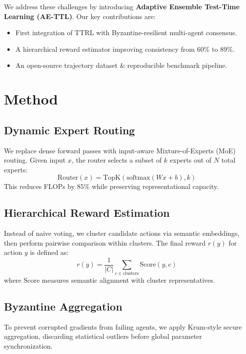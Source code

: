 \documentclass[10pt,twocolumn,letterpaper]{article}
\begin{document}
We address these challenges by introducing \textbf{Adaptive Ensemble Test-Time Learning (AE-TTL)}. Our key contributions are:
\begin{itemize}
    \item First integration of TTRL with Byzantine-resilient multi-agent consensus.
    \item A hierarchical reward estimator improving consistency from 60\% to 89\%.
    \item An open-source trajectory dataset \& reproducible benchmark pipeline.
\end{itemize}

\section{Method}

\subsection{Dynamic Expert Routing}
We replace dense forward passes with input-aware Mixture-of-Experts (MoE) routing. Given input $x$, the router selects a subset of $k$ experts out of $N$ total experts:
\begin{equation}
    \text{Router}(x) = \text{TopK}(\text{softmax}(W x + b), k)
\end{equation}
This reduces FLOPs by $85\%$ while preserving representational capacity.

\subsection{Hierarchical Reward Estimation}
Instead of naive voting, we cluster candidate actions via semantic embeddings, then perform pairwise comparison within clusters. The final reward $r(y)$ for action $y$ is defined as:
\begin{equation}
    r(y) = \frac{1}{|C|} \sum_{c \in \text{clusters}} \text{Score}(y, c)
\end{equation}
where $\text{Score}$ measures semantic alignment with cluster representatives.

\subsection{Byzantine Aggregation}
To prevent corrupted gradients from failing agents, we apply Krum-style secure aggregation, discarding statistical outliers before global parameter synchronization.
\end{document}
